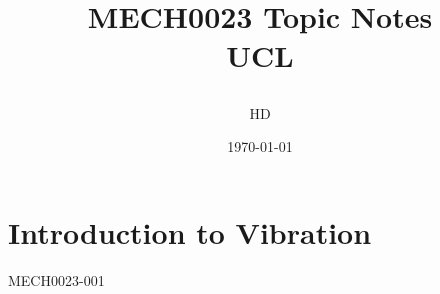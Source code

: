 \documentclass[12pt,a4paper, twoside]{report}
\begin{document}
\title{
  {MECH0023 Topic Notes}\\
  {\large UCL}
  \author{HD}
  \date{\today}
}
\maketitle
\tableofcontents
\chapter{Introduction to Vibration}
{MECH0023-001}
\end{document}
